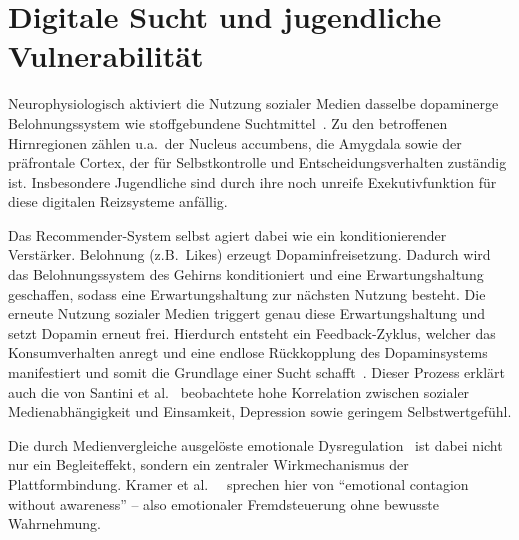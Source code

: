 
\section{Digitale Sucht und jugendliche Vulnerabilität}\label{sec:digitale-sucht-und-jugendliche-vulnerabilitat}

Neurophysiologisch aktiviert die Nutzung sozialer Medien dasselbe dopaminerge Belohnungssystem wie stoffgebundene 
Suchtmittel~\cite{de_social_nodate}.
Zu den betroffenen Hirnregionen zählen u.a.\ der Nucleus accumbens, die Amygdala sowie der präfrontale Cortex, der
für Selbstkontrolle und Entscheidungsverhalten zuständig ist.
Insbesondere Jugendliche sind durch ihre noch unreife Exekutivfunktion für diese digitalen Reizsysteme anfällig.

Das Recommender-System selbst agiert dabei wie ein konditionierender Verstärker.
Belohnung (z.B.\ Likes) erzeugt Dopaminfreisetzung.
Dadurch wird das Belohnungssystem des Gehirns konditioniert und eine Erwartungshaltung geschaffen, sodass eine Erwartungshaltung
zur nächsten Nutzung besteht.
Die erneute Nutzung sozialer Medien triggert genau diese Erwartungshaltung und setzt Dopamin erneut frei.
Hierdurch entsteht ein Feedback-Zyklus, welcher das Konsumverhalten anregt und eine endlose Rückkopplung des
Dopaminsystems manifestiert und somit die Grundlage einer Sucht schafft~\cite{doi:10.1073/pnas.1320040111}.
Dieser Prozess erklärt auch die von Santini et al.~\cite{santini_social_2024} beobachtete hohe Korrelation zwischen sozialer Medienabhängigkeit
und Einsamkeit, Depression sowie geringem Selbstwertgefühl.

Die durch Medienvergleiche ausgelöste emotionale Dysregulation~\cite{doi:10.1177/001872675400700202} ist dabei
nicht nur ein Begleiteffekt, sondern ein zentraler Wirkmechanismus der Plattformbindung. 
Kramer et al.\ ~\cite{doi:10.1073/pnas.1320040111} sprechen hier von \enquote{emotional contagion without awareness} –
also emotionaler Fremdsteuerung ohne bewusste Wahrnehmung.


